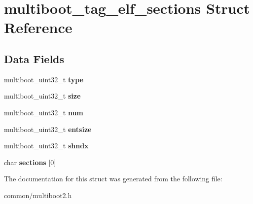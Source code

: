 \hypertarget{structmultiboot__tag__elf__sections}{}\section{multiboot\+\_\+tag\+\_\+elf\+\_\+sections Struct Reference}
\label{structmultiboot__tag__elf__sections}
\subsection*{Data Fields}
\begin{DoxyCompactItemize}
\item 
multiboot\+\_\+uint32\+\_\+t {\bfseries type}\hypertarget{structmultiboot__tag__elf__sections_a6edcf4be60db3099f539a35ba7ab444a}{}\label{structmultiboot__tag__elf__sections_a6edcf4be60db3099f539a35ba7ab444a}

\item 
multiboot\+\_\+uint32\+\_\+t {\bfseries size}\hypertarget{structmultiboot__tag__elf__sections_a37894138127196c9a16c9393058798cd}{}\label{structmultiboot__tag__elf__sections_a37894138127196c9a16c9393058798cd}

\item 
multiboot\+\_\+uint32\+\_\+t {\bfseries num}\hypertarget{structmultiboot__tag__elf__sections_ad31ac6e523f0a7d800c430ba4e5c40dc}{}\label{structmultiboot__tag__elf__sections_ad31ac6e523f0a7d800c430ba4e5c40dc}

\item 
multiboot\+\_\+uint32\+\_\+t {\bfseries entsize}\hypertarget{structmultiboot__tag__elf__sections_aa0ebb417f9c9b0aeb4d925c45f714919}{}\label{structmultiboot__tag__elf__sections_aa0ebb417f9c9b0aeb4d925c45f714919}

\item 
multiboot\+\_\+uint32\+\_\+t {\bfseries shndx}\hypertarget{structmultiboot__tag__elf__sections_a807febf95505382acf44b0fd7e783ab8}{}\label{structmultiboot__tag__elf__sections_a807febf95505382acf44b0fd7e783ab8}

\item 
char {\bfseries sections} \mbox{[}0\mbox{]}\hypertarget{structmultiboot__tag__elf__sections_a09293d54b2741dde5be5f7206860b669}{}\label{structmultiboot__tag__elf__sections_a09293d54b2741dde5be5f7206860b669}

\end{DoxyCompactItemize}


The documentation for this struct was generated from the following file\+:\begin{DoxyCompactItemize}
\item 
common/multiboot2.\+h\end{DoxyCompactItemize}
